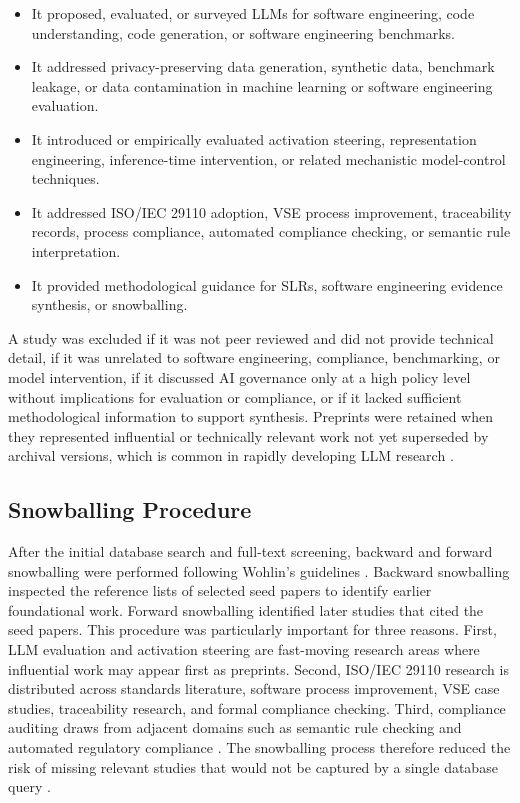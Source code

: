 \documentclass{ieeeaccess}
\begin{document}
\begin{itemize}
    \item It proposed, evaluated, or surveyed LLMs for software engineering, code understanding, code generation, or software engineering benchmarks.
    \item It addressed privacy-preserving data generation, synthetic data, benchmark leakage, or data contamination in machine learning or software engineering evaluation.
    \item It introduced or empirically evaluated activation steering, representation engineering, inference-time intervention, or related mechanistic model-control techniques.
    \item It addressed ISO/IEC 29110 adoption, VSE process improvement, traceability records, process compliance, automated compliance checking, or semantic rule interpretation.
    \item It provided methodological guidance for SLRs, software engineering evidence synthesis, or snowballing.
\end{itemize}

A study was excluded if it was not peer reviewed and did not provide technical detail, if it was unrelated to software engineering, compliance, benchmarking, or model intervention, if it discussed AI governance only at a high policy level without implications for evaluation or compliance, or if it lacked sufficient methodological information to support synthesis. Preprints were retained when they represented influential or technically relevant work not yet superseded by archival versions, which is common in rapidly developing LLM research \cite{touvron2023llama,jiang2023mistral,abdin2024phi3,riviere2024gemma2,yang2024qwen25}.

\subsection{Snowballing Procedure}
\label{subsec:slr_snowballing}

After the initial database search and full-text screening, backward and forward snowballing were performed following Wohlin's guidelines \cite{wohlin2014snowballing}. Backward snowballing inspected the reference lists of selected seed papers to identify earlier foundational work. Forward snowballing identified later studies that cited the seed papers. This procedure was particularly important for three reasons. First, LLM evaluation and activation steering are fast-moving research areas where influential work may appear first as preprints. Second, ISO/IEC 29110 research is distributed across standards literature, software process improvement, VSE case studies, traceability research, and formal compliance checking. Third, compliance auditing draws from adjacent domains such as semantic rule checking and automated regulatory compliance \cite{guo2021semantic,zheng2022semantic}. The snowballing process therefore reduced the risk of missing relevant studies that would not be captured by a single database query \cite{jalali2012database,wohlin2022hybrid}.
\end{document}
